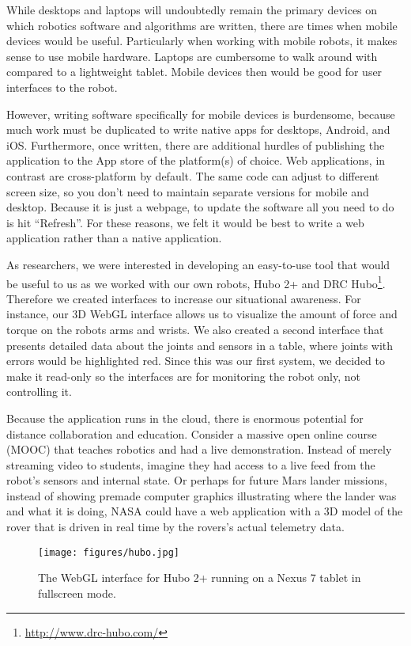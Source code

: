 \documentclass[letterpaper, 10 pt, conference]{ieee/ieeeconf}  %
\begin{document}
While desktops and laptops will undoubtedly remain the primary devices on which robotics software and algorithms are written, there are times when mobile devices would be useful.
Particularly when working with mobile robots, it makes sense to use mobile hardware.
Laptops are cumbersome to walk around with compared to a lightweight tablet.
Mobile devices then would be good for user interfaces to the robot.

However, writing software specifically for mobile devices is burdensome, because much work must be duplicated to write native apps for desktops, Android, and iOS.
Furthermore, once written, there are additional hurdles of publishing the application to the App store of the platform(s) of choice.
Web applications, in contrast are cross-platform by default.
The same code can adjust to different screen size, so you don't need to maintain separate versions for mobile and desktop.
Because it is just a webpage, to update the software all you need to do is hit ``Refresh''.
For these reasons, we felt it would be best to write a web application rather than a native application.

As researchers, we were interested in developing an easy-to-use tool that would be useful to us as we worked with our own robots, Hubo 2+ \cite{park2007mechanical} and DRC Hubo\footnote{\url{http://www.drc-hubo.com/}}.  
Therefore we created interfaces to increase our situational awareness.
For instance, our 3D WebGL interface allows us to visualize the amount of force and torque on the robots arms and wrists.
We also created a second interface that presents detailed data about the joints and sensors in a table, where joints with errors would be highlighted red.
Since this was our first system, we decided to make it read-only so the interfaces are for monitoring the robot only, not controlling it.

Because the application runs in the cloud, there is enormous potential for distance collaboration and education.
Consider a massive open online course (MOOC) that teaches robotics and had a live demonstration.
Instead of merely streaming video to students, imagine they had access to a live feed from the robot's sensors and internal state.
Or perhaps for future Mars lander missions, instead of showing premade computer graphics illustrating where the lander was and what it is doing, NASA could have a web application with a 3D model of the rover that is driven in real time by the rovers's actual telemetry data.

\begin{figure}[thpb]
  \centering
  \texttt{[image: figures/hubo.jpg]}
  \caption{The WebGL interface for Hubo 2+ running on a Nexus 7 tablet in fullscreen mode.}
  \label{fig:Hubo2}
\end{figure}
\end{document}
